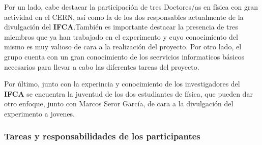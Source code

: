 \documentclass[11pt]{extarticle}
\begin{document}
				Por un lado, cabe destacar la participación de tres Doctores/as en física con gran actividad en el CERN, así como la de los dos responsables actualmente de la divulgación del \textbf{IFCA}.También es importante destacar la presencia de tres miembros que ya han trabajado en el experimento y cuyo conocimiento del mismo es muy valioso de cara a la realización del proyecto. Por otro lado, el grupo cuenta con un gran conocimiento de los seervicios informaticos básicos necesarios para llevar a cabo las diferentes tareas del proyecto.

				Por último, junto con la experincia y conocimiento de los investigadores del \textbf{IFCA} se encuentra la juventud de los dos estudiantes de física, que pueden dar otro enfoque, junto con Marcos Seror García, de cara a la divulgación del experimento a jovenes.

				\subsubsection{Tareas y responsabilidades de los participantes}
					\label{SubSec:}
\end{document}
